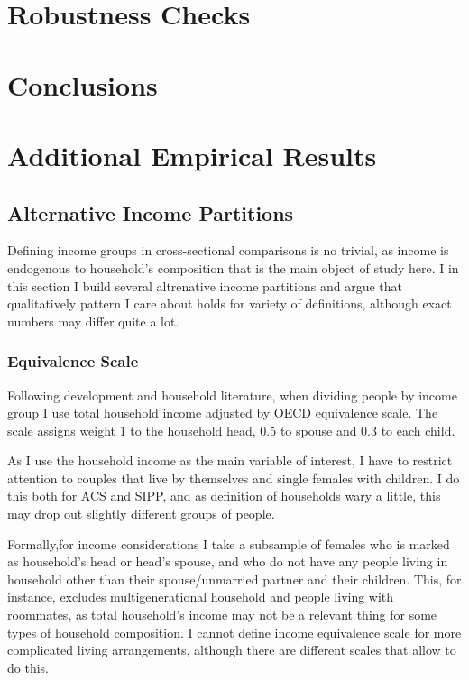 \documentclass[12pt,letter]{article}
\begin{document}
\newpage
\section{Robustness Checks}
\section{Conclusions}

\appendix
\section{Additional Empirical Results}
\subsection{Alternative Income Partitions\label{inc-part}}

Defining income groups in cross-sectional comparisons is no trivial, as income is endogenous to household's composition that is the main object of study here. I in this section I build several altrenative income partitions and argue that qualitatively pattern I care about holds for variety of definitions, although exact numbers may differ quite a lot.



\subsubsection{Equivalence Scale}

Following development and household literature, when dividing people by income group I use total household income adjusted by OECD equivalence scale. The scale assigns weight 1 to the household head, 0.5 to spouse and 0.3 to each child.

As I use the household income as the main variable of interest, I have to restrict attention to couples that live by themselves and single females with children. I do this both for ACS and SIPP, and as definition of households wary a little, this may drop out slightly different groups of people.

Formally,for income considerations I take a subsample of females who is marked as household's head or head's spouse, and who do not have any people living in household other than their spouse/unmarried partner and their children. This, for instance, excludes multigenerational household and people living with roommates, as total household's income may not be a relevant thing for some types of household composition. I cannot define income equivalence scale for more complicated living arrangements, although there are different scales that allow to do this.
\end{document}
